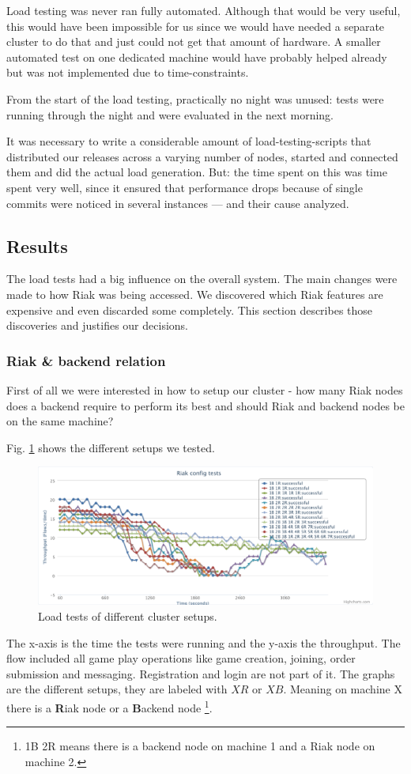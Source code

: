 \documentclass[11pt,a4paper]{report}
\begin{document}
Load testing was never ran fully automated. Although that would be very useful,
this would have been impossible for us since we would have needed a separate
cluster to do that and just could not get that amount of hardware.
A smaller automated test on one dedicated machine would have probably helped
already but was not implemented due to time-constraints.

From the start of the load testing, practically no night was unused: tests were
running through the night and were evaluated in the next morning.

It was necessary to write a considerable amount of load-testing-scripts that
distributed our releases across a varying number of nodes, started and connected
them and did the actual load generation. But: the time spent on this was time
spent very well, since it ensured that performance drops because of single
commits were noticed in several instances --- and their cause analyzed.

\subsection{Results}
The load tests had a big influence on the overall system.
The main changes were made to how Riak was being accessed.
We discovered which Riak features are expensive and
even discarded some completely.
This section describes those discoveries and justifies our decisions.

\subsubsection{Riak \& backend relation}
First of all we were interested in how to setup our cluster -
how many Riak nodes does a backend require to perform its best and
should Riak and backend nodes be on the same machine?

Fig. \ref{fig:load_test:setup} shows the different setups we tested.
\begin{figure}[htbp!]
 \hspace{-2.5cm}
 \includegraphics[width=18cm]{./graphics/Load_test-setup.pdf}
 \caption{Load tests of different cluster setups.}
 \label{fig:load_test:setup}
\end{figure}
The x-axis is the time the tests were running and the y-axis the throughput.
The flow included all game play operations like game creation, joining,
order submission and messaging.
Registration and login are not part of it.
The graphs are the different setups, they are labeled with $XR$ or $XB$.
Meaning on machine X there is a {\bf R}iak node or a {\bf B}ackend node
\footnote{1B 2R means there is a backend node on machine 1 and a Riak node on machine 2.}.
\end{document}
